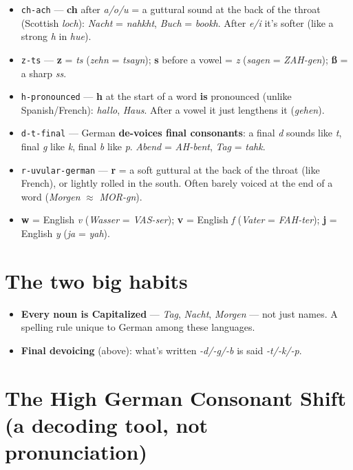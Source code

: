 \begin{itemize}
\raggedright
\setlength{\itemsep}{0.35em}
  \item \texttt{ch-ach} — \textbf{ch} after \emph{a/o/u} = a guttural sound at the back of the throat (Scottish \emph{loch}): \emph{Nacht} = \emph{nahkht}, \emph{Buch} = \emph{bookh}. After \emph{e/i} it's softer (like a strong \emph{h} in \emph{hue}).
  \item \texttt{z-ts} — \textbf{z} = \emph{ts} (\emph{zehn} = \emph{tsayn}); \textbf{s} before a vowel = \emph{z} (\emph{sagen} = \emph{ZAH-gen}); \textbf{ß} = a sharp \emph{ss}.
  \item \texttt{h-pronounced} — \textbf{h} at the start of a word \textbf{is} pronounced (unlike Spanish/French): \emph{hallo}, \emph{Haus}. After a vowel it just lengthens it (\emph{gehen}).
  \item \texttt{d-t-final} — German \textbf{de-voices final consonants}: a final \emph{d} sounds like \emph{t}, final \emph{g} like \emph{k}, final \emph{b} like \emph{p}. \emph{Abend} = \emph{AH-bent}, \emph{Tag} = \emph{tahk}.
  \item \texttt{r-uvular-german} — \textbf{r} = a soft guttural at the back of the throat (like French), or lightly rolled in the south. Often barely voiced at the end of a word (\emph{Morgen} $\approx$ \emph{MOR-gn}).
  \item \textbf{w} = English \emph{v} (\emph{Wasser} = \emph{VAS-ser}); \textbf{v} = English \emph{f} (\emph{Vater} = \emph{FAH-ter}); \textbf{j} = English \emph{y} (\emph{ja} = \emph{yah}).
\end{itemize}

\section*{The two big habits}

\begin{itemize}
\raggedright
\setlength{\itemsep}{0.35em}
  \item \textbf{Every noun is Capitalized} — \emph{Tag}, \emph{Nacht}, \emph{Morgen} — not just names. A spelling rule unique to German among these languages.
  \item \textbf{Final devoicing} (above): what's written \emph{-d/-g/-b} is said \emph{-t/-k/-p}.
\end{itemize}

\section*{The High German Consonant Shift (a decoding tool, not pronunciation)}

